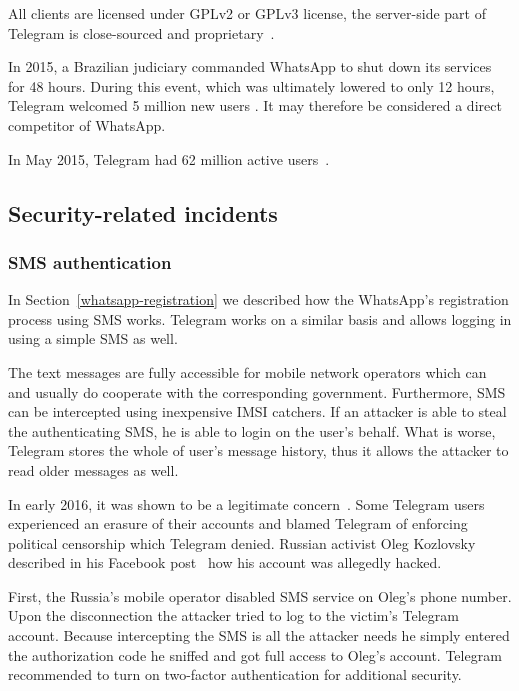 \documentclass[thesis=M,english]{FITthesis}[2012/10/20]
\begin{document}
All clients are licensed under GPLv2 or GPLv3 license, the server-side part of Telegram is close-sourced and proprietary~\cite{telegram-server}.

In 2015, a Brazilian judiciary commanded WhatsApp to shut down its services for 48 hours. During this event, which was ultimately lowered to only 12 hours, Telegram welcomed 5 million new users \cite{whatsappbrazil}. It may therefore be considered a direct competitor of WhatsApp.

In May 2015, Telegram had 62 million active users~\cite{telegram-users}.


\subsection{Security-related incidents}

\subsubsection{SMS authentication}

In Section~\ref{whatsapp-registration} we described how the WhatsApp's registration process using SMS works. Telegram works on a similar basis and allows logging in using a simple SMS as well.

The text messages are fully accessible for mobile network operators which can and usually do cooperate with the corresponding government. Furthermore, SMS can be intercepted using inexpensive IMSI catchers. If an attacker is able to steal the authenticating SMS, he is able to login on the user's behalf. What is worse, Telegram stores the whole of user's message history, thus it allows the attacker to read older messages as well.

In early 2016, it was shown to be a legitimate concern~\cite{telegram-smsiran}. Some Telegram users experienced an erasure of their accounts and blamed Telegram of enforcing political censorship which Telegram denied. Russian activist Oleg Kozlovsky described in his Facebook post~\cite{telegram-russia} how his account was allegedly hacked.

First, the Russia's mobile operator disabled SMS service on Oleg's phone number. Upon the disconnection the attacker tried to log to the victim's Telegram account. Because intercepting the SMS is all the attacker needs he simply entered the authorization code he sniffed and got full access to Oleg's account. Telegram recommended to turn on two-factor authentication for additional security.
\end{document}
